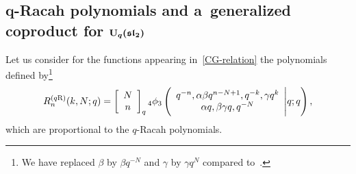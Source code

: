 \documentclass[10pt,a4paper]{amsart}
\numberwithin{equation}{section}
\theoremstyle{definition}
\begin{document}
\subsection[q-Racah polynomials and a~generalized coproduct for U\_q(sl\_2)]{$\boldsymbol{q}$-Racah polynomials and a~generalized coproduct for $\boldsymbol{{\rm U}_q(\mathfrak{sl}_2)}$} \label{eq:coqr}

Let us consider for the functions appearing in~\eqref{CG-relation} the polynomials defined by\footnote{We have replaced $\beta$ by $\beta q^{-N}$ and $\gamma$ by $\gamma q^N$ compared to~\cite{contiguity}.}
\[R^{(q{\rm R})}_n(k,N;q)=\left[\begin{array}{c} N \\ n \end{array}\right]_q
{}_4\phi_3\left(\begin{array}{c} q^{-n}, \alpha\beta q^{n-N+1}, q^{-k}, \gamma q^{k} \\ \alpha q, \beta\gamma q, q^{-N}\end{array}\Bigg\vert q;q\right),\]
which are proportional to the $q$-Racah polynomials.
\end{document}
